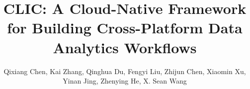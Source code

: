 \documentclass[sigconf, nonacm]{acmart}
\newcommand\vldbdoi{XX.XX/XXX.XX}
\newcommand\vldbpages{XXX-XXX}
\newcommand\vldbvolume{14}
\newcommand\vldbissue{1}
\newcommand\vldbyear{2020}
\newcommand\vldbauthors{\authors}
\newcommand\vldbtitle{\shorttitle}
\newcommand\vldbavailabilityurl{http://vldb.org/pvldb/format_vol14.html}
\newcommand\vldbpagestyle{plain}
\begin{document}
\title{CLIC: A Cloud-Native Framework for Building Cross-Platform Data Analytics Workflows}


\author{Qixiang Chen, Kai Zhang, Qinghua Du, Fengyi Liu, Zhijun Chen, Xiaomin Xu, Yinan Jing, Zhenying He, X. Sean Wang}




\maketitle

\iffalse
\pagestyle{\vldbpagestyle}
\begingroup\small\noindent\raggedright\textbf{PVLDB Reference Format:}\\
\vldbauthors. \vldbtitle. PVLDB, \vldbvolume(\vldbissue): \vldbpages, \vldbyear.\\
\href{https://doi.org/\vldbdoi}{doi:\vldbdoi}
\endgroup
\begingroup
\renewcommand\thefootnote{}\footnote{\noindent
This work is licensed under the Creative Commons BY-NC-ND 4.0 International License. Visit \url{https://creativecommons.org/licenses/by-nc-nd/4.0/} to view a copy of this license. For any use beyond those covered by this license, obtain permission by emailing \href{mailto:info@vldb.org}{info@vldb.org}. Copyright is held by the owner/author(s). Publication rights licensed to the VLDB Endowment. \\
\raggedright Proceedings of the VLDB Endowment, Vol. \vldbvolume, No. \vldbissue\ %
ISSN 2150-8097. \\
\href{https://doi.org/\vldbdoi}{doi:\vldbdoi} \\
}\addtocounter{footnote}{-1}\endgroup

\ifdefempty{\vldbavailabilityurl}{}{
\vspace{.3cm}
\begingroup\small\noindent\raggedright\textbf{PVLDB Artifact Availability:}\\
The source code, data, and/or other artifacts have been made available at \url{\vldbavailabilityurl}.
\endgroup
}
\fi










\end{document}
